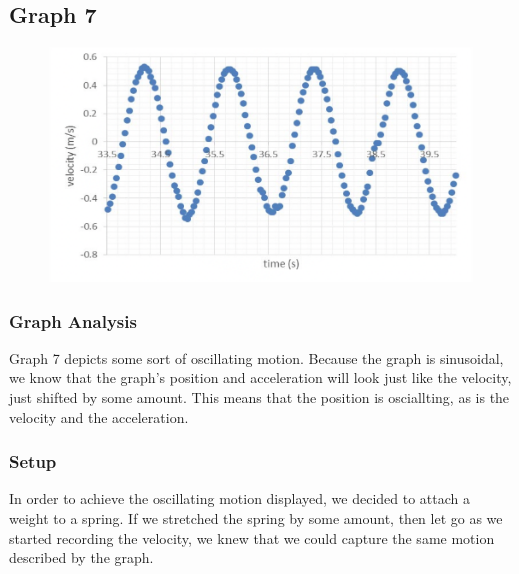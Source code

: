 \documentclass[11pt, letterpaper, includehead]{article}
\begin{document}

  \subsection{Graph 7}

  \begin{figure}[H] %
    \centering 
    \includegraphics[width=\linewidth]{graph_7.png}
  \end{figure}

  \subsubsection{Graph Analysis}
  Graph 7 depicts some sort of oscillating motion. Because the graph is 
  sinusoidal, we know that the graph's position and acceleration will look
  just like the velocity, just shifted by some amount. This means that the 
  position is osciallting, as is the velocity and the acceleration.
  \subsubsection{Setup}
  In order to achieve the oscillating motion displayed, we decided to attach
  a weight to a spring. If we stretched the spring by some amount, then
  let go as we started recording the velocity, we knew that we could capture
  the same motion described by the graph.





\end{document}
